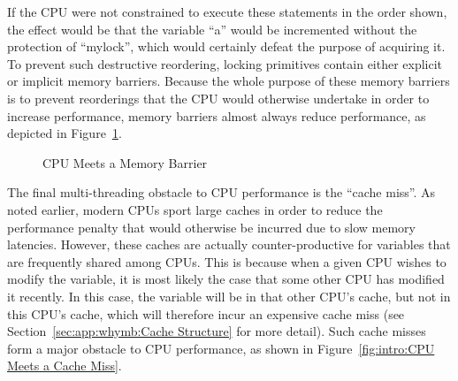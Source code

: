 If the CPU were not constrained to execute these statements in the
order shown, the effect would be that the variable ``a'' would be
incremented without the protection of ``mylock'', which would certainly
defeat the purpose of acquiring it.
To prevent such destructive reordering, locking primitives contain
either explicit or implicit memory barriers.
Because the whole purpose of these memory barriers is to prevent reorderings
that the CPU would otherwise undertake in order to increase performance,
memory barriers almost always reduce performance, as depicted in
Figure~\ref{fig:intro:CPU Meets a Memory Barrier}.

\begin{figure}[htb]
\begin{center}
\end{center}
\caption{CPU Meets a Memory Barrier}
\label{fig:intro:CPU Meets a Memory Barrier}
\end{figure}

The final multi-threading obstacle to CPU performance is the ``cache miss''.
As noted earlier, modern CPUs sport large caches in order to reduce the
performance penalty that would otherwise be incurred due to slow memory
latencies.
However, these caches are actually counter-productive for variables that
are frequently shared among CPUs.
This is because when a given CPU wishes to modify the variable, it is
most likely the case that some other CPU has modified it recently.
In this case, the variable will be in that other CPU's cache, but not
in this CPU's cache, which will therefore incur an expensive cache miss
(see Section~\ref{sec:app:whymb:Cache Structure} for more detail).
Such cache misses form a major obstacle to CPU performance, as shown
in Figure~\ref{fig:intro:CPU Meets a Cache Miss}.

